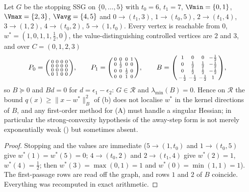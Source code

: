 \begin{proposition}\label{hz:singular}
Let $G$ be the stopping SSG on $\{0,\dots,5\}$ with $t_0=6$, $t_1=7$,
$\Vmin=\{0,1\}$, $\Vmax=\{2,3\}$, $\Vavg=\{4,5\}$ and
$0\to(t_1,3)$, $1\to(t_0,5)$, $2\to(t_1,4)$, $3\to(1,2)$, $4\to(t_0,2)$,
$5\to(1,t_0)$. Every vertex is reachable from $0$,
$w^\ast=(1,0,1,1,\tfrac12,0)$, the value-distinguishing controlled vertices are
$2$ and $3$, and over $C=(0,1,2,3)$
\[
  P_0=\begin{psmallmatrix}0&0&0&0\\0&0&0&0\\0&0&0&0\\0&1&0&0\end{psmallmatrix},\qquad
  P_1=\begin{psmallmatrix}0&0&0&1\\0&\frac12&0&0\\0&0&\frac12&0\\0&0&1&0\end{psmallmatrix},\qquad
  B=\begin{psmallmatrix}1&0&0&-\frac12\\0&\frac12&\frac12&-\frac12\\
  0&\frac12&\frac12&-\frac12\\-\frac12&-\frac12&-\frac12&1\end{psmallmatrix},
\]
so $B\succeq0$ and $Bd=0$ for $d=\epsilon_1-\epsilon_2$: $G\in\mathcal R$ and
$\lambda_{\min}(B)=0$. Hence on $\mathcal R$ the bound
$q(x)\ge\|x-w^\ast\|_B^{2}$ of (b) does not localise
$w^{\ast}$ in the kernel directions of $B$, and any first-order method for
\textup{(A)} must handle a singular Hessian; in particular the strong-convexity
hypothesis of the away-step form is not merely exponentially weak
() but sometimes absent.
\end{proposition}

\begin{proof}
Stopping and the values are immediate ($5\to(1,t_0)$ and $1\to(t_0,5)$ give
$w^\ast(1)=w^\ast(5)=0$; $4\to(t_0,2)$ and $2\to(t_1,4)$ give
$w^\ast(2)=1$, $w^\ast(4)=\tfrac12$; then $w^\ast(3)=\max(0,1)=1$ and
$w^\ast(0)=\min(1,1)=1$). The first-passage rows are read off the graph, and
rows $1$ and $2$ of $B$ coincide. Everything was recomputed in exact
arithmetic.
\end{proof}

